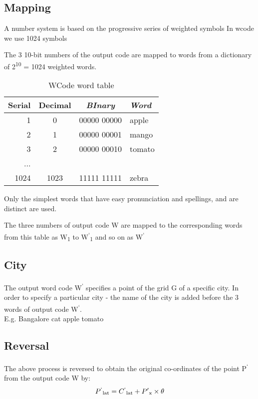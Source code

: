 \documentclass[conference]{IEEEtran}
\begin{document}
\subsection{Mapping}

A number system is based on the progressive series of weighted symbols
In wcode we use 1024 symbols

The 3 10-bit numbers of the output code are mapped to words from a dictionary of 2\textsuperscript{10} = 1024 weighted words.
\begin{table}[h!]
\caption{WCode word table} \begin{center}
\bgroup
\def\arraystretch{1.4}%
\begin{tabular}{r|c|c|l}
\textbf{Serial} & \textbf{Decimal} & \textbf{\textit{BInary}} & \textbf{\textit{Word}} \\
\hline
1 & 0 & 00000 00000 & apple\\
\hline
2 & 1 & 00000 00001 & mango \\
\hline
3 & 2 & 00000 00010 & tomato \\
... & & & \\
1024 & 1023 & 11111 11111 & zebra
\end{tabular}
\egroup
\end{center} \end{table}

Only the simplest words that have easy pronunciation and spellings, and are distinct are used.

The three numbers of output code W are mapped to the corresponding words from this table as W\textsubscript{1} to W\textsuperscript{`}\textsubscript{1} and so on as W\textsuperscript{`}
\subsection{City}
The output word code W\textsuperscript{`} specifies a point of the grid G of a specific city. In order to specify a particular city - the name of the city is added before the 3 words of output code W\textsuperscript{`}.\\

E.g. Bangalore cat apple tomato

\subsection{Reversal}\label{AA}
The above process is reversed to obtain the original co-ordinates of the point P\textsuperscript{`} from the output code W by:
\begin{equation}P\textsuperscript{`}\textsubscript{lat} = C\textsuperscript{`}\textsubscript{lat} +  P'\textsubscript{x} \times {\theta}\end{equation}
\end{document}
